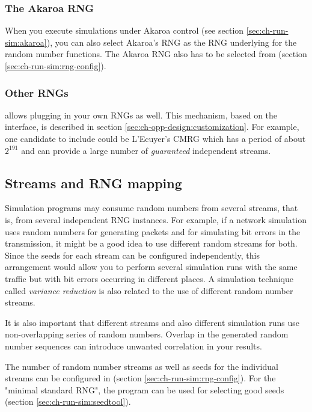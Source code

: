 \subsubsection{The Akaroa RNG}

When you execute simulations under Akaroa control (see section
\ref{sec:ch-run-sim:akaroa}), you can also select Akaroa's
RNG as the RNG underlying for the {\opp} random number functions.
The Akaroa RNG also has to be selected from 
(section \ref{sec:ch-run-sim:rng-config}).

\subsubsection{Other RNGs}

{\opp} allows plugging in your own RNGs as well. This mechanism,
based on the  interface, is described in section
\ref{sec:ch-opp-design:customization}.
For example, one candidate to include could be L'Ecuyer's CMRG \cite{LEcuyer02}
which has a period of about $2^{191}$ and can provide a large
number of \textit{guaranteed} independent streams.


\subsection{Streams and RNG mapping}

Simulation programs may consume random numbers from several streams,
that is, from several independent RNG instances. For example, if a
network simulation uses random numbers for generating packets and
for simulating bit errors in the transmission, it might be a good
idea to use different random streams for both. Since the seeds
for each stream can be configured independently, this arrangement
would allow you to perform several simulation runs with the same traffic
but with bit errors occurring in different places.
A simulation technique called \textit{variance reduction} is
also related to the use of different random number streams.

It is also important that different streams and also different
simulation runs use non-overlapping series of random numbers.
Overlap in the generated random number sequences can introduce
unwanted correlation in your results.

The number of random number streams as well as seeds for the individual
streams can be configured in 
(section \ref{sec:ch-run-sim:rng-config}).
For the "minimal standard RNG", the  program can be
used for selecting good seeds (section \ref{sec:ch-run-sim:seedtool}).

